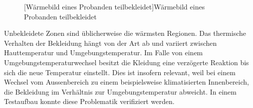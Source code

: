 \begin{figure}[!ht]
\begin{minipage}[b]{0.4\linewidth}
		[Wärmebild eines Probanden teilbekleidet]{Wärmebild eines Probanden teilbekleidet}
		\label{fig:Waermebild2}	
	\end{minipage}
\end{figure}

 Unbekleidete Zonen sind üblicherweise die wärmsten Regionen. Das thermische Verhalten der Bekleidung hängt von der Art ab und variiert zwischen Hauttemperatur und Umgebungstemperatur. Im Falle von einem Umgebungstemperaturwechsel besitzt die Kleidung eine verzögerte Reaktion bis sich die neue Temperatur einstellt. Dies ist insofern relevant, weil bei einem Wechsel vom Aussenbereich zu einem beispielsweise klimatisierten Innenbereich, die Bekleidung im Verhältnis zur Umgebungstemperatur abweicht. In einem Testaufbau konnte diese Problematik verifiziert werden. 

